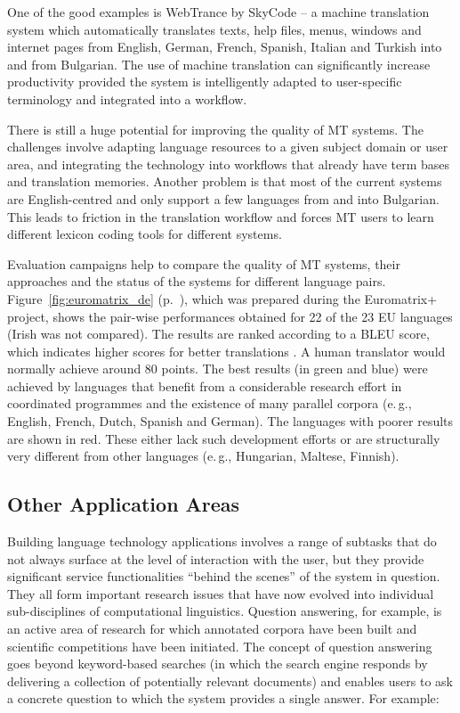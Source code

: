 \begin{multicols}{2}
  One of the good examples is WebTrance by SkyCode – a machine translation system which automatically translates texts, help files, menus, windows and internet pages from English, German, French, Spanish, Italian and Turkish into and from Bulgarian.  The use of machine translation can significantly increase productivity provided the system is intelligently adapted to user-specific terminology and integrated into a workflow. 

  There is still a huge potential for improving the quality of MT systems. The challenges involve adapting language resources to a given subject domain or user area, and integrating the technology into workflows that already have term bases and translation memories. Another problem is that most of the current systems are English-centred and only support a few languages from and into Bulgarian. This leads to friction in the translation workflow and forces MT users to learn different lexicon coding tools for different systems.

  Evaluation campaigns help to compare the quality of MT systems, their approaches and the status of the systems for different language pairs. Figure~\ref{fig:euromatrix_de} (p.~\pageref{fig:euromatrix_de}), which was prepared during the Euromatrix+ project, shows the pair-wise performances obtained for 22 of the 23 EU languages (Irish was not compared). The results are ranked according to a BLEU score, which indicates higher scores for better translations \cite{bleu1}. A human translator would normally achieve around 80 points. The best results (in green and blue) were achieved by languages that benefit from a considerable research effort in coordinated programmes and the existence of many parallel corpora (e.\,g., English, French, Dutch, Spanish and German). The languages with poorer results are shown in red. These either lack such development efforts or are structurally very different from other languages (e.\,g., Hungarian, Maltese, Finnish).
\vfill

  \subsection{Other Application Areas}

  Building language technology applications involves a range of subtasks that do not always surface at the level of interaction with the user, but they provide significant service functionalities “behind the scenes” of the system in question. They all form important research issues that have now evolved into individual sub-disciplines of computational linguistics. Question answering, for example, is an active area of research for which annotated corpora have been built and scientific competitions have been initiated. The concept of question answering goes beyond keyword-based searches (in which the search engine responds by delivering a collection of potentially relevant documents) and enables users to ask a concrete question to which the system provides a single answer. For example:


\end{multicols}
